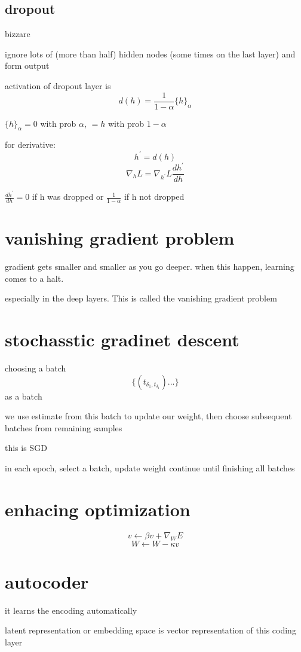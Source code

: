 \documentclass[10pt]{article}
\theoremstyle{break}
\begin{document}
\subsection{dropout}
bizzare

ignore lots of (more than half) hidden nodes (some times on the last layer) and form output

activation of dropout layer is $$d(h)=\frac{1}{1-\alpha}\{h\}_\alpha$$

$\{h\}_\alpha = 0 $ with prob $\alpha$, $=h$ with prob $1-\alpha$ 

for derivative:
$$h^{'} = d(h)$$
$$\nabla _h L = \nabla _{h^{'}}L\frac{dh^{'}}{dh}$$

$\frac{dh^{'}}{dh} = 0$ if h was dropped or $\frac{1}{1-\alpha}$ if h not dropped

\section{vanishing gradient problem}

gradient gets smaller and smaller as you go deeper. when this happen, learning comes to a halt.

especially in the deep layers. This is called the vanishing gradient problem 

\section{stochasstic gradinet descent}
choosing a batch 
$$\{(t_{\delta_1, t_{\delta_1}})...\}$$ as a batch

we use estimate from this batch to update our weight, then choose subsequent batches from remaining samples 

this is SGD

in each epoch, select a batch, update weight continue until finishing all batches 
\section{enhacing optimization}
$$v\leftarrow \beta v + \nabla_WE$$
$$W\leftarrow W - \kappa v$$

\section{autocoder}
it learns the encoding automatically

latent representation or embedding space is vector representation of this coding layer
\end{document}
